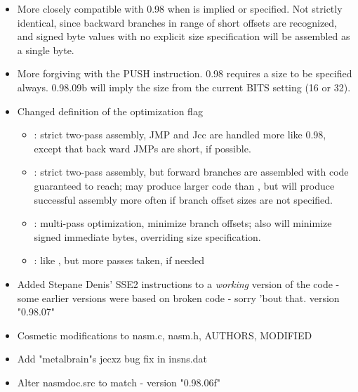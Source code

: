 \begin{itemize}
    \item{More closely compatible with 0.98 when  is implied
        or specified. Not strictly identical, since backward
        branches in range of short offsets are recognized, and signed
        byte values with no explicit size specification will be
        assembled as a single byte.}
    \item{More forgiving with the PUSH instruction. 0.98 requires
        a size to be specified always. 0.98.09b will imply the size
        from the current BITS setting (16 or 32).}
    \item{Changed definition of the optimization flag
        \begin{itemize}
            \item{: strict two-pass assembly, JMP and Jcc are
                handled more like 0.98, except that back ward JMPs are
                short, if possible.}
            \item{: strict two-pass assembly, but forward
                branches are assembled with code guaranteed
                to reach; may produce larger code than
                , but will produce successful assembly
                more often if branch offset sizes are not
                specified.}
            \item{: multi-pass optimization, minimize branch
                offsets; also will minimize signed immediate bytes,
                overriding size specification.}
            \item{: like , but more passes taken,
                if needed}
        \end{itemize}}
\end{itemize}


\begin{itemize}
    \item{Added Stepane Denis' SSE2 instructions to a \emph{working}
        version of the code - some earlier versions were based on
        broken code - sorry 'bout that. version "0.98.07"}
    \item{Cosmetic modifications to nasm.c, nasm.h, AUTHORS, MODIFIED}
\end{itemize}


\begin{itemize}
    \item{Add "metalbrain"s jecxz bug fix in insns.dat}
    \item{Alter nasmdoc.src to match - version "0.98.06f"}
\end{itemize}


